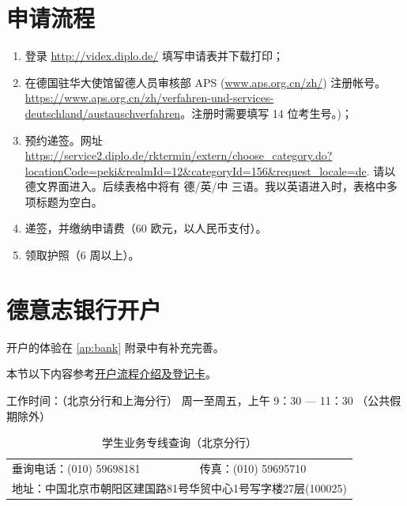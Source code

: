 \documentclass[final]{book}
\begin{document}
\section{申请流程}
\begin{enumerate}
\item 登录 \url{http://videx.diplo.de/} 填写申请表并下载打印；
\item \sloppy 在德国驻华大使馆留德人员审核部 APS (\url{www.aps.org.cn/zh/}) 注册帐号。\url{https://www.aps.org.cn/zh/verfahren-und-services-deutschland/austauschverfahren}。注册时需要填写 14 位考生号。)；
\item 预约递签。网址 \url{https://service2.diplo.de/rktermin/extern/choose_category.do?locationCode=peki&realmId=12&categoryId=156&request_locale=de}. 请以德文界面进入。后续表格中将有 德/英/中 三语。我以英语进入时，表格中多项标题为空白。 
\item 递签，并缴纳申请费（60 欧元，以人民币支付）。
\item 领取护照（6 周以上）。
\end{enumerate}

\section[德意志银行开户]{德意志银行开户}
开户的体验在 \ref{ap:bank} 附录中有补充完善。

本节以下内容参考\href{https://china.db.com/china/docs/Deutsche_Bank-China-Account-Opening-Process-And-Introduction.pdf}{开户流程介绍及登记卡}。

工作时间：（北京分行和上海分行） 周一至周五，上午 9：30 --- 11：30 （公共假期除外）

\begin{table}[htbp]
\caption{学生业务专线查询（北京分行）}
\label{tb:bank-communication}
\centering
\begin{tabular}{ll}
  垂询电话：(010) 59698181 & 传真：(010) 59695710 \\
  \multicolumn{2}{l}{地址：中国北京市朝阳区建国路81号华贸中心1号写字楼27层(100025)}
\end{tabular}  
\end{table}
\end{document}
